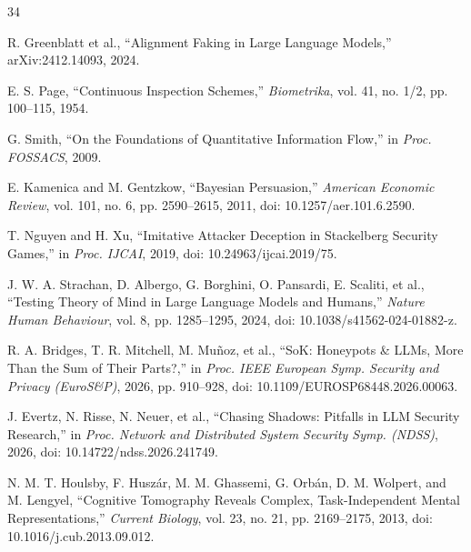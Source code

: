 
\begin{thebibliography}{34}

R. Greenblatt et al., ``Alignment Faking in Large Language Models,''
arXiv:2412.14093, 2024.

E. S. Page, ``Continuous Inspection Schemes,'' \emph{Biometrika}, vol. 41,
no. 1/2, pp. 100--115, 1954.

G. Smith, ``On the Foundations of Quantitative Information Flow,'' in
\emph{Proc. FOSSACS}, 2009.

E. Kamenica and M. Gentzkow, ``Bayesian Persuasion,'' \emph{American Economic
Review}, vol. 101, no. 6, pp. 2590--2615, 2011, doi: 10.1257/aer.101.6.2590.

T. Nguyen and H. Xu, ``Imitative Attacker Deception in Stackelberg Security
Games,'' in \emph{Proc. IJCAI}, 2019, doi: 10.24963/ijcai.2019/75.

J. W. A. Strachan, D. Albergo, G. Borghini, O. Pansardi, E. Scaliti, et al.,
``Testing Theory of Mind in Large Language Models and Humans,'' \emph{Nature
Human Behaviour}, vol. 8, pp. 1285--1295, 2024, doi:
10.1038/s41562-024-01882-z.

R. A. Bridges, T. R. Mitchell, M. Mu{\~n}oz, et al., ``SoK: Honeypots \& LLMs,
More Than the Sum of Their Parts?,'' in \emph{Proc. IEEE European Symp.
Security and Privacy (EuroS\&P)}, 2026, pp. 910--928, doi:
10.1109/EUROSP68448.2026.00063.

J. Evertz, N. Risse, N. Neuer, et al., ``Chasing Shadows: Pitfalls in LLM
Security Research,'' in \emph{Proc. Network and Distributed System Security
Symp. (NDSS)}, 2026, doi: 10.14722/ndss.2026.241749.

N. M. T. Houlsby, F. Husz{\'a}r, M. M. Ghassemi, G. Orb{\'a}n, D. M. Wolpert,
and M. Lengyel, ``Cognitive Tomography Reveals Complex, Task-Independent
Mental Representations,'' \emph{Current Biology}, vol. 23, no. 21, pp.
2169--2175, 2013, doi:
10.1016/j.cub.2013.09.012.


\end{thebibliography}
